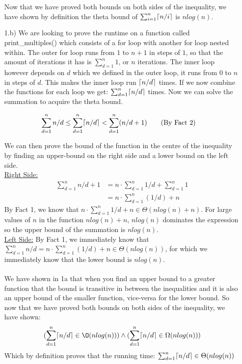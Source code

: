 \documentclass[20pt]{article}
\DeclarePairedDelimiter{\ceil}{\lceil}{\rceil}
\begin{document}
\begin{enumerate}
    Now that we have proved both bounds on both sides of the inequality, we have shown by definition the theta bound of $\sum_{i = 1}^{n}\ceil{n/i}$ is $nlog(n)$.
    
    \item [1.b)] We are looking to prove the runtime on a function called print\_multiples() which consists of a for loop with another for loop nested within. The outer for loop runs from $1$ to $n+1$ in steps of $1$, so that the amount of iterations it has is $\sum_{d = 1}^{n}1$, or $n$ iterations. The inner loop however depends on $d$ which we defined in the outer loop, it runs from $0$ to $n$ in steps of $d$. This makes the inner loop run $\ceil{n/d}$ times. If we now combine the functions for each loop we get: $\sum_{d = 1}^{n}\ceil{n/d}$ times. Now we can solve the summation to acquire the theta bound.
    
    \begin{align}
        \sum_{d = 1}^{n}n/d &\leq \sum_{d = 1}^{n}\ceil{n/d} < \sum_{d = 1}^{n}(n/d + 1) \tag{By Fact 2}
    \end{align}
    
    We can then prove the bound of the function in the centre of the inequality by finding an upper-bound on the right side and a lower bound on the left side.\\
    \underline{Right Side:}
    \begin{align}
        \sum_{d = 1}^{n}n/d + 1 &= n\cdot\sum_{d = 1}^{n}1/d + \sum_{d = 1}^{n}1 \nonumber\\
        &= n\cdot\sum_{d = 1}^{n}(1/d) + n\nonumber
    \end{align}
    By Fact 1, we know that $n\cdot\sum_{d = 1}^{n}1/d + n \in \Theta(nlog(n) + n)$. For large values of $n$ in the function $nlog(n) + n$, $nlog(n)$ dominates the expression so the upper bound of the summation is $nlog(n)$.\\
    
    \underline{Left Side:}
    By Fact 1, we immediately know that $\sum_{d = 1}^{n}n/d = n\cdot\sum_{d = 1}^{n}(1/d) + n \in \Theta(nlog(n))$, for which we immediately know that the lower bound is $nlog(n)$.\\\\
    
    We have shown in 1a that when you find an upper bound to a greater function that the bound is transitive in between the inequalities and it is also an upper bound of the smaller function, vice-versa for the lower bound. So now that we have proved both bounds on both sides of the inequality, we have shown:\\
    \begin{align}
        (\sum_{d = 1}^{n}\ceil{n/d} \in \O(nlog(n))) \land (\sum_{d = 1}^{n}\ceil{n/d} \in \Omega(nlog(n))) \nonumber
    \end{align}
    Which by definition proves that the running time: $\sum_{d = 1}^{n}\ceil{n/d} \in \Theta(nlog(n))$\hfill \Box
    

\end{enumerate}
\end{document}
